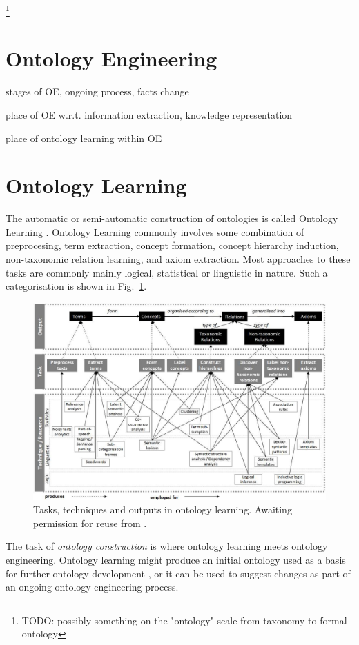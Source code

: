 \documentclass[a4paper]{report}
\newcommand{\todo}[1]{\footnote{{\color{red} TODO: #1}}}
\begin{document}
\todo{possibly something on the "ontology" scale from taxonomy to formal ontology}

\section{Ontology Engineering}

stages of OE, ongoing process, facts change

place of OE w.r.t. information extraction, knowledge representation

place of ontology learning within OE

\section{Ontology Learning}

The automatic or semi-automatic construction of ontologies is called Ontology Learning \cite{Cimiano06}.
Ontology Learning commonly involves some combination of preprocesing, term extraction, concept formation, concept hierarchy induction, non-taxonomic relation learning, and axiom extraction.
Most approaches to these tasks are commonly mainly logical, statistical or linguistic in nature\cite{Wong11Survey}.
Such a categorisation is shown in Fig.~\ref{fig:tasktechout}.
\begin{figure}
  \includegraphics[width=\textwidth]{graphics/output-task-technique-WongLiuBennamoun.png}
  \caption{Tasks, techniques and outputs in ontology learning. Awaiting permission for reuse from \cite{Wong2009PhD}.}
  \label{fig:tasktechout}
\end{figure}
The task of \emph{ontology construction} is where ontology learning meets ontology engineering.
Ontology learning might produce an initial ontology used as a basis for further ontology development \cite{Voelkner2008Spanish}, or it can be used to suggest changes as part of an ongoing ontology engineering process.
\end{document}
